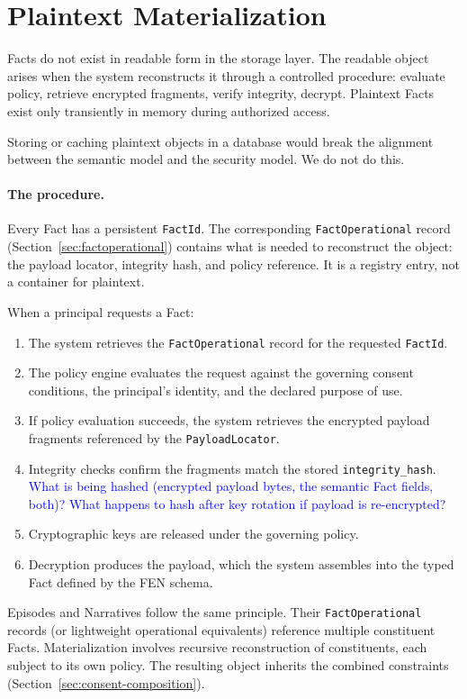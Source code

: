 \documentclass[11pt]{article}
\begin{document}
\section{Plaintext Materialization}

Facts do not exist in readable form in the storage layer. The readable
object arises when the system reconstructs it through a controlled
procedure: evaluate policy, retrieve encrypted fragments, verify
integrity, decrypt. Plaintext Facts exist only transiently in memory
during authorized access.

Storing or caching plaintext objects in a database would break the
alignment between the semantic model and the security model. We do not
do this.

\paragraph{The procedure.}
Every Fact has a persistent \texttt{FactId}. The corresponding
\texttt{FactOperational} record (Section~\ref{sec:factoperational})
contains what is needed to reconstruct the object: the payload locator,
integrity hash, and policy reference. It is a registry entry, not a
container for plaintext.

When a principal requests a Fact:

\begin{enumerate}
\item The system retrieves the \texttt{FactOperational} record for the
  requested \texttt{FactId}.
\item The policy engine evaluates the request against the governing
  consent conditions, the principal's identity, and the declared purpose
  of use.
\item If policy evaluation succeeds, the system retrieves the encrypted
  payload fragments referenced by the \texttt{PayloadLocator}.
\item Integrity checks confirm the fragments match the stored
  \texttt{integrity\_hash}.
  \textcolor{blue}{What is being hashed (encrypted payload bytes, the semantic Fact fields, both)?  What happens to hash after key rotation if payload is re-encrypted?}
\item Cryptographic keys are released under the governing policy.
\item Decryption produces the payload, which the system assembles into
  the typed Fact defined by the FEN schema.
\end{enumerate}

Episodes and Narratives follow the same principle. Their
\texttt{FactOperational} records (or lightweight operational
equivalents) reference multiple constituent Facts. Materialization
involves recursive reconstruction of constituents, each subject to its
own policy. The resulting object inherits the combined constraints
(Section~\ref{sec:consent-composition}).
\end{document}
